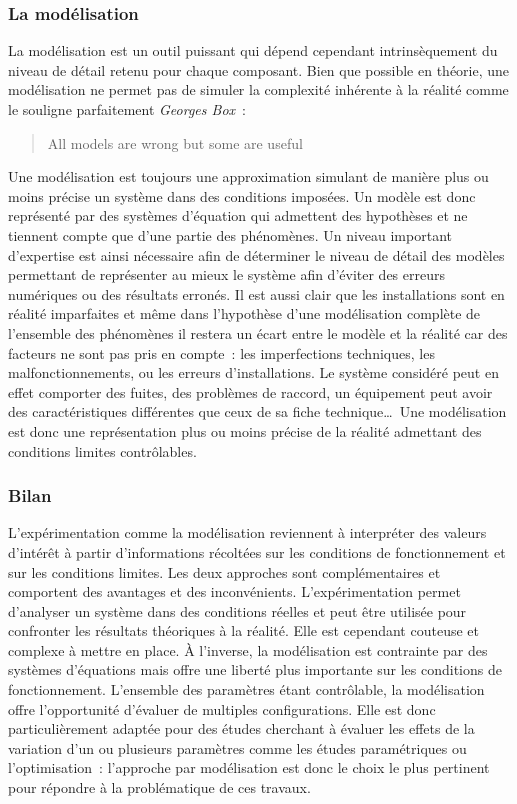 \subsubsection{La modélisation} %
\label{ssub:la_modelisation}
La modélisation est un outil puissant qui dépend cependant intrinsèquement du niveau de
détail retenu pour chaque composant. Bien que possible en théorie, une modélisation ne
permet pas de simuler la complexité inhérente à la réalité comme le souligne parfaitement
\textit{Georges Box}~:
\blockquote{All models are wrong but some are useful}
Une modélisation est toujours une approximation simulant de manière plus ou moins précise
un système dans des conditions imposées. Un modèle est donc représenté par des systèmes
d’équation qui admettent des hypothèses et ne tiennent compte que d’une partie des
phénomènes. Un niveau important d’expertise est ainsi nécessaire afin de déterminer le
niveau de détail des modèles permettant de représenter au mieux le système afin d’éviter
des erreurs numériques ou des résultats erronés. Il est aussi clair que les installations
sont en réalité imparfaites et même dans l’hypothèse d’une modélisation complète de
l’ensemble des phénomènes il restera un écart entre le modèle et la réalité car des
facteurs ne sont pas pris en compte~: les imperfections techniques, les
malfonctionnements, ou les erreurs d’installations. Le système considéré peut en effet
comporter des fuites, des problèmes de raccord, un équipement peut avoir des
caractéristiques différentes que ceux de sa fiche technique\dots\
Une modélisation est donc une représentation plus ou moins précise de la réalité
admettant des conditions limites contrôlables.


\subsubsection{Bilan} %
\label{ssub:bilan_modelisation}
L’expérimentation comme la modélisation reviennent à interpréter des valeurs d’intérêt à
partir d’informations récoltées sur les conditions de fonctionnement et sur les conditions
limites. Les deux approches sont complémentaires et comportent des avantages et des
inconvénients. L’expérimentation permet d’analyser un système dans des conditions réelles
et peut être utilisée pour confronter les résultats théoriques à la réalité. Elle est
cependant couteuse et complexe à mettre en place. À l’inverse, la modélisation est
contrainte par des systèmes d’équations mais offre une liberté plus importante sur les
conditions de fonctionnement. L’ensemble des paramètres étant contrôlable, la
modélisation offre l’opportunité d’évaluer de multiples configurations. Elle est donc
particulièrement adaptée pour des études cherchant à évaluer les effets de la variation
d’un ou plusieurs paramètres comme les études paramétriques ou l’optimisation~:
l’approche par modélisation est donc le choix le plus pertinent pour répondre à la
problématique de ces travaux.

